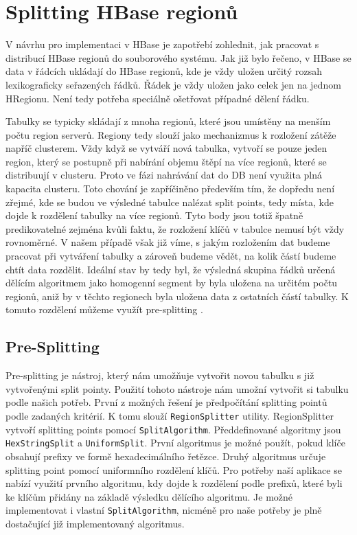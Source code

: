 \documentclass[thesis=M,czech]{FITthesis}[2012/06/26]
\begin{document}
\section{Splitting HBase regionů}
V návrhu pro implementaci v HBase je zapotřebí zohlednit, jak pracovat s distribucí HBase regionů do souborového systému. Jak již bylo řečeno, v HBase se data v řádcích ukládají do HBase regionů, kde je vždy uložen určitý rozsah lexikograficky seřazených řádků. Řádek je vždy uložen jako celek jen na jednom HRegionu. Není tedy potřeba speciálně ošetřovat případné dělení řádku. 

Tabulky se typicky skládají z mnoha regionů, které jsou umístěny na menším počtu region serverů. Regiony tedy slouží jako mechanizmus k rozložení zátěže napříč clusterem. Vždy když se vytváří nová tabulka, vytvoří se pouze jeden region, který se postupně při nabírání objemu štěpí na více regionů, které se distribuují v clusteru. Proto ve fázi nahrávání dat do DB není využita plná kapacita clusteru. Toto chování je zapříčiněno především tím, že dopředu není zřejmé, kde se budou ve výsledné tabulce nalézat split points, tedy místa, kde dojde k rozdělení tabulky na více regionů. Tyto body jsou totiž špatně predikovatelné zejména kvůli faktu, že rozložení klíčů v tabulce nemusí být vždy rovnoměrné. V našem případě však již víme, s jakým rozložením dat budeme pracovat při vytváření tabulky a zároveň budeme vědět, na kolik částí budeme chtít data rozdělit. Ideální stav by tedy byl, že výsledná skupina řádků určená dělícím algoritmem jako homogenní segment by byla uložena na určitém počtu regionů, aniž by v těchto regionech byla uložena data z ostatních částí tabulky. K tomuto rozdělení můžeme využít pre-splitting \cite{split}.

\subsection{Pre-Splitting}
Pre-splitting je nástroj, který nám umožňuje vytvořit novou tabulku s již vytvořenými split pointy. Použití tohoto nástroje nám umožní vytvořit si tabulku podle našich potřeb. První z možných řešení je předpočítání splitting pointů podle zadaných kritérií. K tomu slouží \texttt{RegionSplitter} utility. RegionSplitter vytvoří splitting points pomocí \texttt{SplitAlgorithm}. Předdefinované algoritmy jsou \texttt{HexStringSplit} a \texttt{UniformSplit}. První algoritmus je možné použít, pokud klíče obsahují prefixy ve formě hexadecimálního řetězce. Druhý algoritmus určuje splitting point pomocí uniformního rozdělení klíčů. Pro potřeby naší aplikace se nabízí využití prvního algoritmu, kdy dojde k rozdělení podle prefixů, které byli ke klíčům přidány na základě výsledku dělícího algoritmu. Je možné implementovat i vlastní \texttt{SplitAlgorithm}, nicméně pro naše potřeby je plně dostačující již implementovaný algoritmus.
\end{document}
